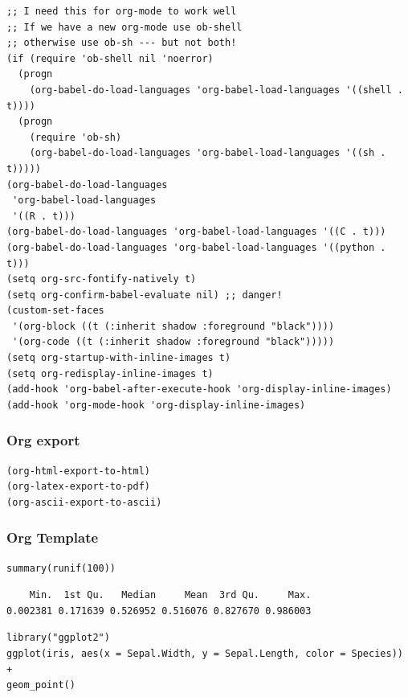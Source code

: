 \documentclass[11pt]{article}
\begin{document}
\begin{verbatim}
;; I need this for org-mode to work well
;; If we have a new org-mode use ob-shell
;; otherwise use ob-sh --- but not both!
(if (require 'ob-shell nil 'noerror)
  (progn
    (org-babel-do-load-languages 'org-babel-load-languages '((shell . t))))
  (progn
    (require 'ob-sh)
    (org-babel-do-load-languages 'org-babel-load-languages '((sh . t)))))
(org-babel-do-load-languages
 'org-babel-load-languages
 '((R . t)))
(org-babel-do-load-languages 'org-babel-load-languages '((C . t)))
(org-babel-do-load-languages 'org-babel-load-languages '((python . t)))
(setq org-src-fontify-natively t)
(setq org-confirm-babel-evaluate nil) ;; danger!
(custom-set-faces
 '(org-block ((t (:inherit shadow :foreground "black"))))
 '(org-code ((t (:inherit shadow :foreground "black")))))
(setq org-startup-with-inline-images t)
(setq org-redisplay-inline-images t)
(add-hook 'org-babel-after-execute-hook 'org-display-inline-images)   
(add-hook 'org-mode-hook 'org-display-inline-images)   
\end{verbatim}


\subsubsection{Org export}
\label{sec:org6a191d3}
\begin{verbatim}
(org-html-export-to-html)
(org-latex-export-to-pdf)
(org-ascii-export-to-ascii)
\end{verbatim}


\subsubsection{Org Template}
\label{sec:org2c48a7b}

\begin{verbatim}
summary(runif(100))
\end{verbatim}

\begin{verbatim}
    Min.  1st Qu.   Median     Mean  3rd Qu.     Max. 
0.002381 0.171639 0.526952 0.516076 0.827670 0.986003
\end{verbatim}


\begin{verbatim}
library("ggplot2")
ggplot(iris, aes(x = Sepal.Width, y = Sepal.Length, color = Species)) +
geom_point()
\end{verbatim}
\end{document}
